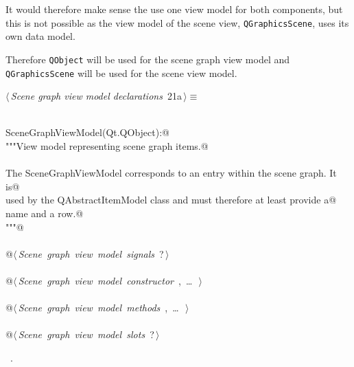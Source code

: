 \documentclass[
    a4paper,      %
    10pt,         %
    openright,    %
    notitlepage,  %
    parskip=half, %
]{scrreprt}       %
\theoremstyle{definition}                    %
\begin{document}
It would therefore make sense the use one view model for both components, but
this is not possible as the view model of the scene view, \verb+QGraphicsScene+,
uses its own data model.

Therefore \verb+QObject+ will be used for the scene graph view model and
\verb+QGraphicsScene+ will be used for the scene view model.

\begin{flushleft} \small
\begin{minipage}{\linewidth}\label{scrap14}\raggedright\small
{} $\langle\,${\itshape Scene graph view model declarations}\nobreak\ {\footnotesize {21a}}$\,\rangle\equiv$
\vspace{-1ex}
\begin{list}{}{} \item
\mbox{}\lstinline@@\\
\mbox{}\lstinline@class SceneGraphViewModel(Qt.QObject):@\\
\mbox{}\lstinline@    """View model representing scene graph items.@\\
\mbox{}\lstinline@@\\
\mbox{}\lstinline@    The SceneGraphViewModel corresponds to an entry within the scene graph. It is@\\
\mbox{}\lstinline@    used by the QAbstractItemModel class and must therefore at least provide a@\\
\mbox{}\lstinline@    name and a row.@\\
\mbox{}\lstinline@    """@\\
\mbox{}\lstinline@@\\
\mbox{}\lstinline@    @\hbox{$\langle\,${\itshape Scene graph view model signals}\nobreak\ {\footnotesize ?}$\,\rangle$}\lstinline@@\\
\mbox{}\lstinline@@\\
\mbox{}\lstinline@    @\hbox{$\langle\,${\itshape Scene graph view model constructor}\nobreak\ {\footnotesize {}, \ldots\ }$\,\rangle$}\lstinline@@\\
\mbox{}\lstinline@@\\
\mbox{}\lstinline@    @\hbox{$\langle\,${\itshape Scene graph view model methods}\nobreak\ {\footnotesize {}, \ldots\ }$\,\rangle$}\lstinline@@\\
\mbox{}\lstinline@@\\
\mbox{}\lstinline@    @\hbox{$\langle\,${\itshape Scene graph view model slots}\nobreak\ {\footnotesize ?}$\,\rangle$}\lstinline@@\\
\mbox{}\lstinline@@{\NWsep}
\end{list}
\vspace{-1.5ex}
\footnotesize
\begin{list}{}{\setlength{\itemsep}{-\parsep}\setlength{\itemindent}{-\leftmargin}}
\item \NWtxtMacroRefIn\ .

\item{}
\end{list}
\end{minipage}\vspace{4ex}
\end{flushleft}
\end{document}
